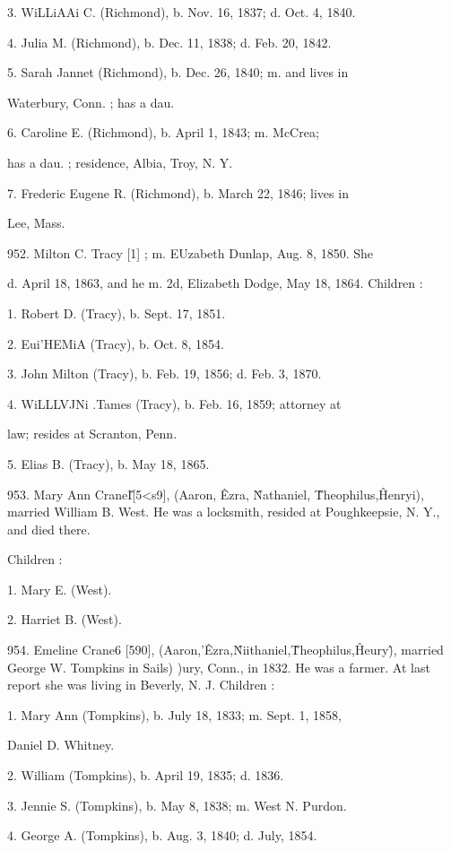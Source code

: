 \documentclass{book}
\begin{document}
3. WiLLiAAi C. (Richmond), b. Nov. 16, 1837; d. Oct. 4, 1840. 

4. Julia M. (Richmond), b. Dec. 11, 1838; d. Feb. 20, 1842. 

5. Sarah Jannet (Richmond), b. Dec. 26, 1840; m. and lives in 

Waterbury, Conn. ; has a dau. 

6. Caroline E. (Richmond), b. April 1, 1843; m. McCrea; 

has a dau. ; residence, Albia, Troy, N. Y. 

7. Frederic Eugene R. (Richmond), b. March 22, 1846; lives in 

Lee, Mass. 

952. Milton C. Tracy [1] ; m. EUzabeth Dunlap, Aug. 8, 1850. She 

d. April 18, 1863, and he m. 2d, Elizabeth Dodge, May 18, 
1864. Children : 

1. Robert D. (Tracy), b. Sept. 17, 1851. 

2. Eui'HEMiA (Tracy), b. Oct. 8, 1854. 

3. John Milton (Tracy), b. Feb. 19, 1856; d. Feb. 3, 1870. 

4. WiLLLVJNi .Tames (Tracy), b. Feb. 16, 1859; attorney at 

law; resides at Scranton, Penn. 

5. Elias B. (Tracy), b. May 18, 1865. 

953. Mary Ann CraneI\^ [5<s9], (Aaron, \^ Ezra, \^ Nathaniel, \^ 
Theophilus,\^ Henryi), married William B. West. He was a 
locksmith, resided at Poughkeepsie, N. Y., and died there. 

Children : 

1. Mary E. (West). 

2. Harriet B. (West). 

954. Emeline Crane6 [590], (Aaron,'\^ Ezra,\^ Niithaniel,\^ 
Theophilus,\^ Heury\^), married George W. Tompkins in Sails) )ury, 
Conn., in 1832. He was a farmer. At last report she was living 
in Beverly, N. J. Children : 

1. Mary Ann (Tompkins), b. July 18, 1833; m. Sept. 1, 1858, 

Daniel D. Whitney. 

2. William (Tompkins), b. April 19, 1835; d. 1836. 

3. Jennie S. (Tompkins), b. May 8, 1838; m. West N. Purdon. 

4. George A. (Tompkins), b. Aug. 3, 1840; d. July, 1854. 
\end{document}
